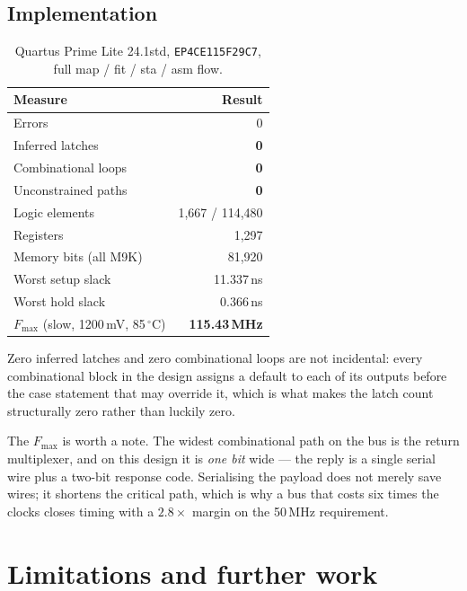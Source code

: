 \documentclass[11pt,a4paper]{article}
\newcommand{\sig}[1]{\texttt{#1}}
\begin{document}
\subsection{Implementation}

\begin{table}[htb]
\centering\small
\caption{Quartus Prime Lite 24.1std, \sig{EP4CE115F29C7}, full
map / fit / sta / asm flow.}
\begin{tabular}{@{}lr@{}}
\toprule
\textbf{Measure} & \textbf{Result}\\
\midrule
Errors                & 0\\
Inferred latches      & \textbf{0}\\
Combinational loops   & \textbf{0}\\
Unconstrained paths   & \textbf{0}\\
Logic elements        & 1{,}667 / 114{,}480\\
Registers             & 1{,}297\\
Memory bits (all M9K) & 81{,}920\\
Worst setup slack     & 11.337\,ns\\
Worst hold slack      & 0.366\,ns\\
$F_{\max}$ (slow, 1200\,mV, 85\,$^\circ$C) & \textbf{115.43\,MHz}\\
\bottomrule
\end{tabular}
\end{table}

Zero inferred latches and zero combinational loops are not incidental: every
combinational block in the design assigns a default to each of its outputs
before the case statement that may override it, which is what makes the
latch count structurally zero rather than luckily zero.

The $F_{\max}$ is worth a note. The widest combinational path on the bus is
the return multiplexer, and on this design it is \emph{one bit} wide --- the
reply is a single serial wire plus a two-bit response code. Serialising the
payload does not merely save wires; it shortens the critical path, which is
why a bus that costs six times the clocks closes timing with a $2.8\times$
margin on the 50\,MHz requirement.

\section{Limitations and further work}
\label{sec:limits}
\end{document}
